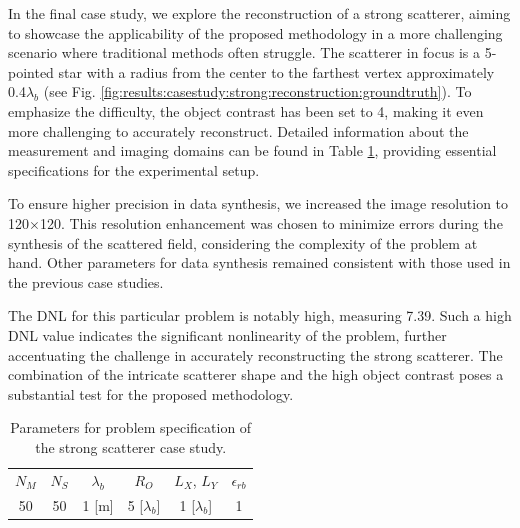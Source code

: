 			In the final case study, we explore the reconstruction of a strong scatterer, aiming to showcase the applicability of the proposed methodology in a more challenging scenario where traditional methods often struggle. The scatterer in focus is a 5-pointed star with a radius from the center to the farthest vertex approximately 0.4$\lambda_b$ (see Fig. \ref{fig:results:casestudy:strong:reconstruction:groundtruth}). To emphasize the difficulty, the object contrast has been set to 4, making it even more challenging to accurately reconstruct. Detailed information about the measurement and imaging domains can be found in Table \ref{tab:results:casestudy:strong:configuration}, providing essential specifications for the experimental setup.
			
			To ensure higher precision in data synthesis, we increased the image resolution to 120$\times$120. This resolution enhancement was chosen to minimize errors during the synthesis of the scattered field, considering the complexity of the problem at hand. Other parameters for data synthesis remained consistent with those used in the previous case studies.
			
			The DNL for this particular problem is notably high, measuring 7.39. Such a high DNL value indicates the significant nonlinearity of the problem, further accentuating the challenge in accurately reconstructing the strong scatterer. The combination of the intricate scatterer shape and the high object contrast poses a substantial test for the proposed methodology.
		
			\begin{table}[!h]
				\centering
				\caption[Parameters for the strong scatterer case study.]{Parameters for problem specification of the strong scatterer case study.}
				\begin{tabular}{cccccc}
					$N_M$ & $N_S$ & $\lambda_b$ & $R_O$ & $L_X$, $L_Y$ & $\epsilon_{rb}$ \\
					50 & 50 & 1 [m] & 5 [$\lambda_b$] & 1 [$\lambda_b$] & 1
				\end{tabular}
				\label{tab:results:casestudy:strong:configuration}
			\end{table}
			
